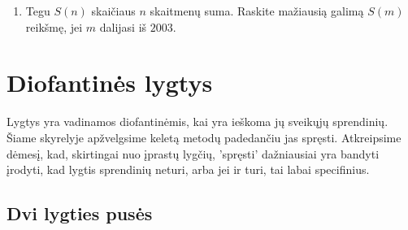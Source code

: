 \begin{enumerate}
  \item \text{[Vietnam 2004]} Tegu $S(n)$ skaičiaus $n$ skaitmenų suma.
    Raskite mažiausią galimą $S(m)$ reikšmę, jei $m$ dalijasi iš $2003$.
 \end{enumerate}

\newpage
\section{Diofantinės lygtys}

Lygtys yra vadinamos diofantinėmis, kai yra ieškoma jų sveikųjų
sprendinių. Šiame skyrelyje apžvelgsime keletą metodų padedančiu jas
spręsti. Atkreipsime dėmesį, kad, skirtingai nuo įprastų lygčių,
'spręsti' dažniausiai yra bandyti įrodyti, kad lygtis sprendinių neturi,
arba jei ir turi, tai labai specifinius.  

\subsection{Dvi lygties pusės}

